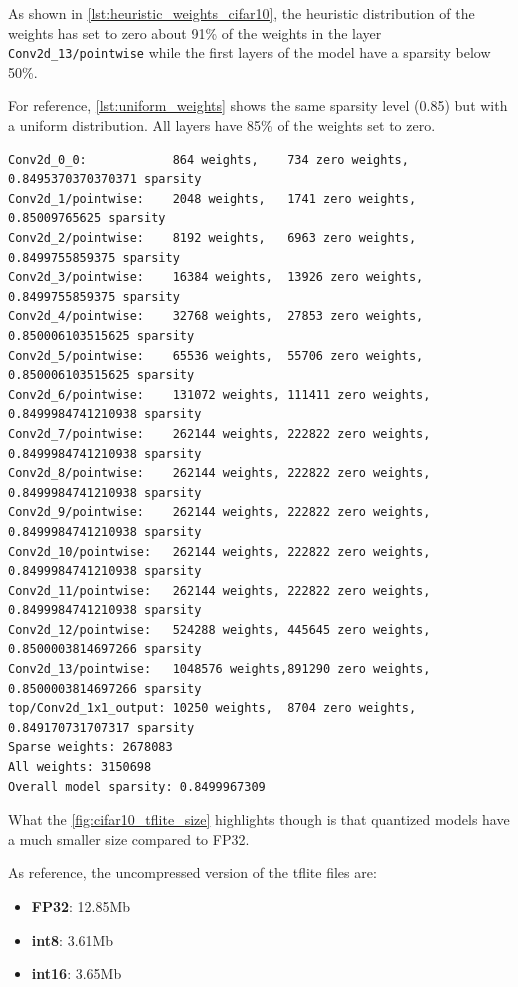 As shown in \autoref{lst:heuristic_weights_cifar10}, the heuristic distribution
of the weights has set to zero about 91\% of the weights in the layer
\texttt{Conv2d\_13/pointwise} while the first layers of the model have a
sparsity below 50\%.

For reference, \autoref{lst:uniform_weights} shows the same sparsity level
(0.85) but with a uniform distribution. All layers have 85\% of the weights set
to zero.

\begin{lstlisting}[label={lst:uniform_weights},
    caption=MobileNet v1 and CIFAR-10: uniform weights distributions]
Conv2d_0_0:            864 weights,    734 zero weights,    0.8495370370370371 sparsity
Conv2d_1/pointwise:    2048 weights,   1741 zero weights,   0.85009765625 sparsity
Conv2d_2/pointwise:    8192 weights,   6963 zero weights,   0.8499755859375 sparsity
Conv2d_3/pointwise:    16384 weights,  13926 zero weights,  0.8499755859375 sparsity
Conv2d_4/pointwise:    32768 weights,  27853 zero weights,  0.850006103515625 sparsity
Conv2d_5/pointwise:    65536 weights,  55706 zero weights,  0.850006103515625 sparsity
Conv2d_6/pointwise:    131072 weights, 111411 zero weights, 0.8499984741210938 sparsity
Conv2d_7/pointwise:    262144 weights, 222822 zero weights, 0.8499984741210938 sparsity
Conv2d_8/pointwise:    262144 weights, 222822 zero weights, 0.8499984741210938 sparsity
Conv2d_9/pointwise:    262144 weights, 222822 zero weights, 0.8499984741210938 sparsity
Conv2d_10/pointwise:   262144 weights, 222822 zero weights, 0.8499984741210938 sparsity
Conv2d_11/pointwise:   262144 weights, 222822 zero weights, 0.8499984741210938 sparsity
Conv2d_12/pointwise:   524288 weights, 445645 zero weights, 0.8500003814697266 sparsity
Conv2d_13/pointwise:   1048576 weights,891290 zero weights, 0.8500003814697266 sparsity
top/Conv2d_1x1_output: 10250 weights,  8704 zero weights,   0.849170731707317 sparsity
Sparse weights: 2678083
All weights: 3150698
Overall model sparsity: 0.8499967309
\end{lstlisting}

What the \autoref{fig:cifar10_tflite_size} highlights though is that quantized
models have a much smaller size compared to FP32.

As reference, the uncompressed version of the tflite files are:
\begin{itemize}
    \item \textbf{FP32}: 12.85Mb
    \item \textbf{int8}: 3.61Mb
    \item \textbf{int16}: 3.65Mb
\end{itemize}

